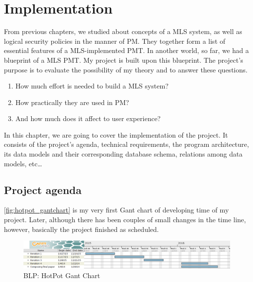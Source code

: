 
\chapter{Implementation} %

\label{ch:implementation} %


From previous chapters, we studied about concepts of a MLS system, as well as logical security policies in the manner of PM.
They together form a list of essential features of a MLS-implemented PMT.
In another world, so far, we had a blueprint of a MLS PMT. 
My \myProject project is built upon this blueprint.
The project's purpose is to evaluate the possibility of my theory and to answer these questions.

\begin{enumerate}
\item How much effort is needed to build a MLS system? 
\item How practically they are used in PM?
\item And how much does it affect to user experience?
\end{enumerate}

In this chapter, we are going to cover the implementation of the project.
It consists of the project's agenda, technical requirements, the program architecture, its data models and their corresponding database schema, relations among data models, etc\dots


\section{Project agenda}

\autoref{fig:hotpot_gantchart} is my very first Gant chart of developing time of my project.
Later, although there has been couples of small changes in the time line, however, basically the project finished as scheduled.

\begin{figure}[bth]                                                                                                                                                  
\myfloatalign
\includegraphics[width=1.0\linewidth]{gfx/chapter_4/hotpot_gantchart}
\caption[HotPot Gant chart]{BLP: HotPot Gant Chart}
\label{fig:hotpot_gantchart}
\end{figure}

